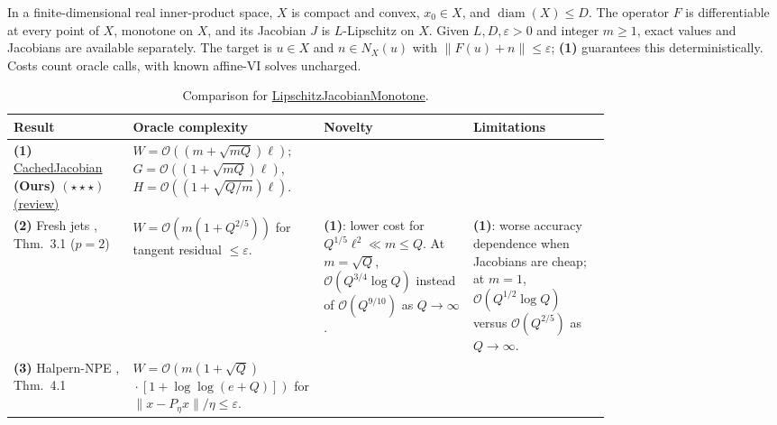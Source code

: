 \begin{table}[tp]
\centering
\caption{Comparison for \href{https://github.com/k3nfalt/longtails/blob/main/LongTails/Setups/LipschitzJacobianMonotone.lean}{LipschitzJacobianMonotone}.}\label{tab:LipschitzJacobianMonotone}
\parbox{\linewidth}{\footnotesize In a finite-dimensional real inner-product space, $X$ is compact and convex, $x_0\in X$, and $\operatorname{diam}(X)\le D$. The operator $F$ is differentiable at every point of $X$, monotone on $X$, and its Jacobian $J$ is $L$-Lipschitz on $X$. Given $L,D,\varepsilon>0$ and integer $m\ge1$, exact values and Jacobians are available separately. The target is $u\in X$ and $n\in N_X(u)$ with $\|F(u)+n\|\le\varepsilon$; \textbf{(1)} guarantees this deterministically. Costs count oracle calls, with known affine-VI solves uncharged.}\par\smallskip
\begin{threeparttable}
\footnotesize
\setlength{\tabcolsep}{4pt}\renewcommand{\arraystretch}{1.25}
\begin{tabularx}{\linewidth}{@{}>{\raggedright\arraybackslash}p{0.20\linewidth}>{\raggedright\arraybackslash}p{0.32\linewidth}>{\raggedright\arraybackslash}p{0.25\linewidth}>{\raggedright\arraybackslash}X@{}}
\toprule
\textbf{Result} & \textbf{Oracle complexity} & \textbf{Novelty} & \textbf{Limitations} \\
\midrule
\textbf{(1)} \href{https://github.com/k3nfalt/longtails/blob/main/LongTails/Theorems/CachedJacobian.lean}{Cached\allowbreak Jacobian} \textbf{(Ours)} $(\star\star\star)$ \href{https://github.com/k3nfalt/longtails/blob/main/scripts/reviews/CachedJacobian.md}{(review)}
& $W=\mathcal{O}((m+\sqrt{mQ})\ell)$;\newline $G=\mathcal{O}((1+\sqrt{mQ})\ell)$,\newline $H=\mathcal{O}((1+\sqrt{Q/m})\ell)$.
& & \\
\midrule[1.2pt]
\textbf{(2)} Fresh jets \citep{ljmZhang2026OptimalV1}, Thm.~3.1 ($p=2$)
& $W=\mathcal{O}(m(1+Q^{2/5}))$ for tangent residual $\le\varepsilon$.
& \textbf{(1)}: lower cost for $Q^{1/5}\ell^2\ll m\le Q$. At $m=\sqrt Q$, $\mathcal{O}(Q^{3/4}\log Q)$ instead of $\mathcal{O}(Q^{9/10})$ as $Q\to\infty$.
& \textbf{(1)}: worse accuracy dependence when Jacobians are cheap; at $m=1$, $\mathcal{O}(Q^{1/2}\log Q)$ versus $\mathcal{O}(Q^{2/5})$ as $Q\to\infty$. \\
\midrule
\textbf{(3)} Halpern-NPE \citep{ljmChen2026HalpernV1}, Thm.~4.1
& $W=\mathcal{O}\!\left(m(1+\sqrt Q)\right.$\newline $\left.{}\cdot[1+\log\log(e+Q)]\right)$ for $\|x-P_\eta x\|/\eta\le\varepsilon$.

\end{tabularx}
\end{threeparttable}
\end{table}
